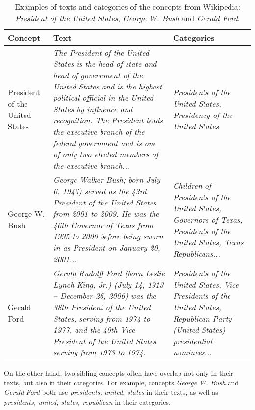 \begin{table*}[ht]
  \small
  \centering
  \begin{tabular}{|p{1.0in}|p{3.5in}|p{2.0in}|}
    \hline
    {\bf Concept} & {\bf Text} & {\bf Categories} \\
    \hline
    \hline
    President of the United States & \textit{The President of the United States is the head of state and head of government of the United States and is the highest political official in the United States by influence and recognition. The President leads the executive branch of the federal government and is one of only two elected members of the executive branch...} & \textit{Presidents of the United States, Presidency of the United States} \\
    \hline
    George W. Bush & \textit{George Walker Bush; born July 6, 1946) served as the 43rd President of the United States from 2001 to 2009. He was the 46th Governor of Texas from 1995 to 2000 before being sworn in as President on January 20, 2001...} & \textit{Children of Presidents of the United States, Governors of Texas, Presidents of the United States, Texas Republicans...} \\
    \hline
    Gerald Ford & \textit{Gerald Rudolff Ford (born Leslie Lynch King, Jr.) (July 14, 1913 – December 26, 2006) was the 38th President of the United States, serving from 1974 to 1977, and the 40th Vice President of the United States serving from 1973 to 1974.} & \textit{Presidents of the United States, Vice Presidents of the United States, Republican Party (United States) presidential nominees...} \\
    \hline
  \end{tabular}
  \caption{Examples of texts and categories of the concepts from Wikipedia: {\em President of the United States}, {\em George W. Bush} and {\em Gerald Ford}.}
  \label{tab:snippets}
\end{table*}

On the other hand, two sibling concepts often have overlap not only in
their texts, but also in their categories. For example, concepts
\emph{George W. Bush} and \emph{Gerald Ford} both use
\emph{presidents, united, states} in their texts, as well as
\emph{presidents, united, states, republican} in their categories.


